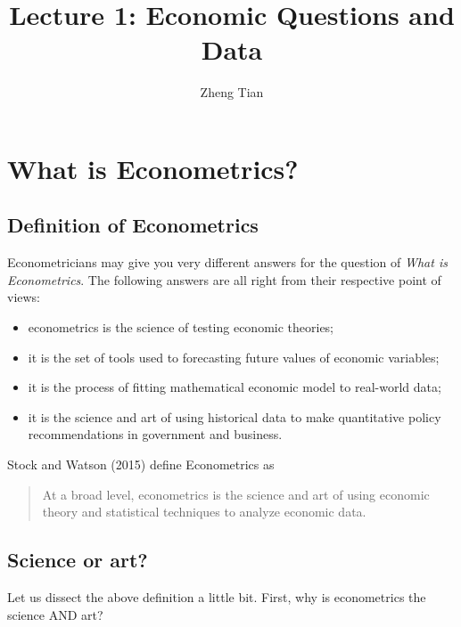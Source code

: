 \documentclass[a4paper,11pt]{article}
\author{Zheng Tian}
\date{}
\title{Lecture 1: Economic Questions and Data}
\begin{document}
\maketitle
\setcounter{tocdepth}{1}
\tableofcontents


\section{What is Econometrics?}
\label{sec:org3ee4e63}

\subsection{Definition of Econometrics}
\label{sec:org3cb51c5}

Econometricians may give you very different answers for the question
of \emph{What is Econometrics}. The following answers are all right from
their respective point of views:
\begin{itemize}
\item econometrics is the science of testing economic theories;
\item it is the set of tools used to forecasting future values
of economic variables;
\item it is the process of fitting mathematical economic model
to real-world data;
\item it is the science and art of using historical data to make
quantitative policy recommendations in government and business.
\end{itemize}

Stock and Watson (2015) define Econometrics as
\begin{quote}
At a broad level, econometrics is the science and art of using
economic theory and statistical techniques to analyze economic
data.
\end{quote}



\subsection{Science or art?}
\label{sec:orgcc77cf9}

Let us dissect the above definition a little bit. First, why is
econometrics the science AND art?
\end{document}
